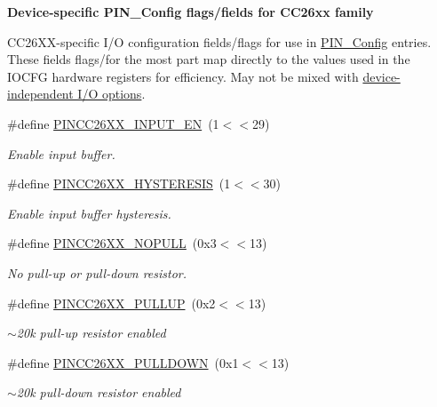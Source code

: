 \begin{Indent}{\bf Device-\/specific P\+I\+N\+\_\+\+Config flags/fields for C\+C26xx family}\par
{\em \label{_p_i_n_c_c26_x_x_8h_PINCC26XX_FLAGS}%
\hypertarget{_p_i_n_c_c26_x_x_8h_PINCC26XX_FLAGS}{}%


C\+C26\+X\+X-\/specific I/\+O configuration fields/flags for use in \hyperlink{_p_i_n_8h_ae427b7d2925f9b0f3145e455cfdb5841}{P\+I\+N\+\_\+\+Config} entries. These fields flags/for the most part map directly to the values used in the {\ttfamily I\+O\+C\+F\+G} hardware registers for efficiency. May not be mixed with \hyperlink{_p_i_n_8h_PIN_GENERIC_FLAGS}{device-\/independent I/\+O options}. }\begin{DoxyCompactItemize}
\item 
\#define \hyperlink{_p_i_n_c_c26_x_x_8h_adceda75e6ee6dfdae2fd7769b809fc0e}{P\+I\+N\+C\+C26\+X\+X\+\_\+\+I\+N\+P\+U\+T\+\_\+\+E\+N}~(1$<$$<$29)
\begin{DoxyCompactList}\small\item\em Enable input buffer. \end{DoxyCompactList}\item 
\#define \hyperlink{_p_i_n_c_c26_x_x_8h_a63fe5dc3570f58ba8aa123db1cee6fe7}{P\+I\+N\+C\+C26\+X\+X\+\_\+\+H\+Y\+S\+T\+E\+R\+E\+S\+I\+S}~(1$<$$<$30)
\begin{DoxyCompactList}\small\item\em Enable input buffer hysteresis. \end{DoxyCompactList}\item 
\#define \hyperlink{_p_i_n_c_c26_x_x_8h_a8e3b3ef05fc9e291a6d9ad9971b8142c}{P\+I\+N\+C\+C26\+X\+X\+\_\+\+N\+O\+P\+U\+L\+L}~(0x3$<$$<$13)
\begin{DoxyCompactList}\small\item\em No pull-\/up or pull-\/down resistor. \end{DoxyCompactList}\item 
\#define \hyperlink{_p_i_n_c_c26_x_x_8h_a25291b96b05bfa0e4ff6365da4cbf221}{P\+I\+N\+C\+C26\+X\+X\+\_\+\+P\+U\+L\+L\+U\+P}~(0x2$<$$<$13)
\begin{DoxyCompactList}\small\item\em $\sim$20k pull-\/up resistor enabled \end{DoxyCompactList}\item 
\#define \hyperlink{_p_i_n_c_c26_x_x_8h_a3fac53dff43a2718044afdcdfa916d53}{P\+I\+N\+C\+C26\+X\+X\+\_\+\+P\+U\+L\+L\+D\+O\+W\+N}~(0x1$<$$<$13)
\begin{DoxyCompactList}\small\item\em $\sim$20k pull-\/down resistor enabled \end{DoxyCompactList}\item 
$$
\end{DoxyCompactItemize}
\end{Indent}
